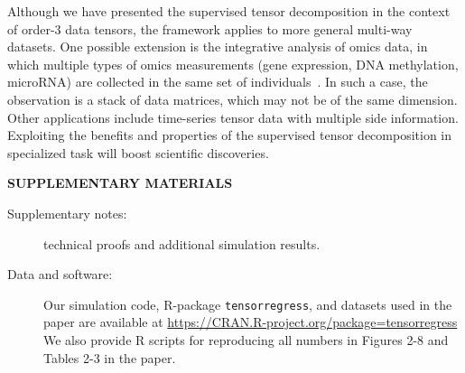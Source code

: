 \documentclass[12pt]{article}
\theoremstyle{definition}
\theoremstyle{definition}
\begin{document}
Although we have presented the supervised tensor decomposition in the context of order-3 data tensors, the framework applies to more general multi-way datasets. One possible extension is the integrative analysis of omics data, in which multiple types of omics measurements (gene expression, DNA methylation, microRNA) are collected in the same set of individuals~\citep{lock2013joint,wang2019three}. In such a case, the observation is a stack of data matrices, which may not be of the same dimension. 
Other applications include time-series tensor data with multiple side information. Exploiting the benefits and properties of the supervised tensor decomposition in specialized task will boost scientific discoveries.


\bigskip
\begin{center}
{\large \bf SUPPLEMENTARY MATERIALS}
\end{center}

\begin{description}
\item[Supplementary notes:]  technical proofs and additional simulation results.
\item[Data and software:] %
Our simulation code, R-package \texttt{tensorregress}, and datasets used in the paper are available at \url{https://CRAN.R-project.org/package=tensorregress} 
We also provide R scripts for reproducing all numbers in Figures 2-8 and Tables 2-3 in the paper.
\end{description}



\end{document}
